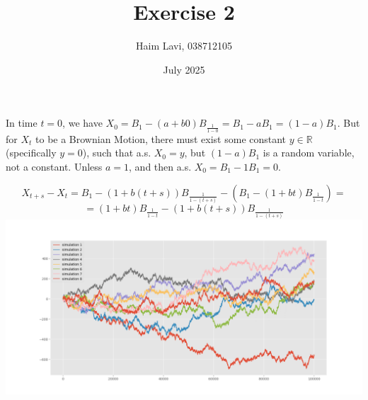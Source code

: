 \documentclass{article}
\title{Exercise 2}
\author{Haim Lavi, 038712105}
\date{July 2025}
\begin{document}
\maketitle

In time $t=0$, we have $X_0=B_1-(a+b0)B_{\frac{1}{1-0}}=B_1-aB_1=(1-a)B_1.$
But for $X_t$ to be a Brownian Motion, there must exist some constant $y\in\mathbb{R}$ (specifically $y=0$), such that a.s. $X_0=y$, but $(1-a)B_1$ is a random variable, not a constant. Unless $a=1$, and then a.s. ${X_0=B_1-1B_1=0}.$

\[X_{t+s}-X_t=B_1-(1+b(t+s))B_{\frac{1}{1-(t+s)}}-(B_1-(1+bt)B_{\frac{1}{1-t}})=\]
\[=(1+bt)B_\frac{1}{1-t}-(1+b(t+s))B_\frac{1}{1-(t+s)}\]
\includegraphics[width=1.5\linewidth]{bm_simulations.png}
\end{document}
